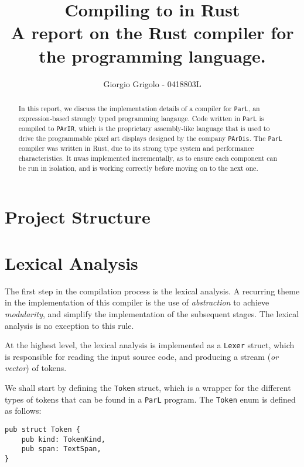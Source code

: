 \documentclass{article}
\title{Compiling \code{ParL} to \code{PArIR} in Rust \\{\normalsize A report on the Rust
compiler for the \code{ParL} programming language.}}
\author{Giorgio Grigolo - 0418803L}
\date{}
\newcommand{\code}[1]{\texttt{#1}}
\begin{document}
\maketitle
\tableofcontents

\begin{abstract}
    In this report, we discuss the implementation details of a
    compiler for \code{ParL}, an expression-based strongly typed programming
    langauge. Code written in \code{ParL} is compiled to \code{PArIR}, which is
    the proprietary assembly-like language that is used to drive the
    programmable pixel art displays designed by the company \code{PArDis}. The
    \code{ParL} compiler was written in Rust, due to its strong type system and
    performance characteristics. It nwas implemented incrementally, as
    to ensure each component can be run in isolation, and is working correctly
    before moving on to the next one.
\end{abstract}

\newpage

\section{Project Structure}

\section{Lexical Analysis}

The first step in the compilation process is the lexical analysis. A recurring
theme in the implementation of this compiler is the use of \textit{abstraction}
to achieve \textit{modularity}, and simplify the implementation of the
subsequent stages. The lexical analysis is no exception to this rule.

At the highest level, the lexical analysis is implemented as a \code{Lexer}
struct, which is responsible for reading the input source code, and producing a
stream (\textit{or vector}) of tokens.

We shall start by defining the \code{Token} struct, which is a wrapper for the
different types of tokens that can be found in a \code{ParL} program. The
\code{Token} enum is defined as follows:

\begin{mainbox}{}
    \begin{lstlisting}
pub struct Token {
    pub kind: TokenKind,
    pub span: TextSpan,
}
    \end{lstlisting}
\end{mainbox}
\end{document}
